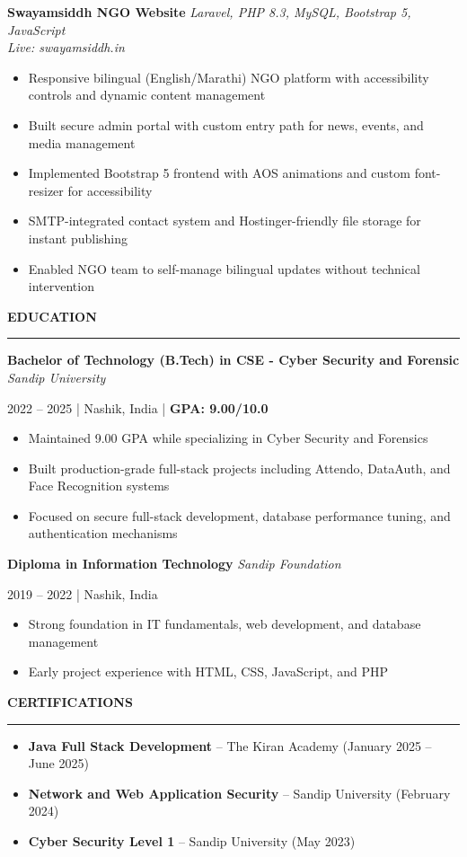 \documentclass[10pt,letterpaper]{article}
\newcommand{\resheading}[1]{
    {\large \textbf{#1}}
    \vspace{0.3em}
    \hrule
    \vspace{0.1em}
}
\newcommand{\ressection}[2]{
    \textbf{#1} \hfill \textit{#2} \\
}
\newcommand{\resitem}[1]{
    \item #1 \vspace{-0.2em}
}
\newcommand{\ressubsection}[4]{
    \ressection{#1}{#2}
    \textit{#3} \newline
    #4
}
\begin{document}
\vspace{0.3em}

\ressubsection{Swayamsiddh NGO Website}{Laravel, PHP 8.3, MySQL, Bootstrap 5, JavaScript}{
Live: swayamsiddh.in
}{
\begin{itemize}[itemsep=0.2em]
    \resitem{Responsive bilingual (English/Marathi) NGO platform with accessibility controls and dynamic content management}
    \resitem{Built secure admin portal with custom entry path for news, events, and media management}
    \resitem{Implemented Bootstrap 5 frontend with AOS animations and custom font-resizer for accessibility}
    \resitem{SMTP-integrated contact system and Hostinger-friendly file storage for instant publishing}
    \resitem{Enabled NGO team to self-manage bilingual updates without technical intervention}
\end{itemize}
}

\vspace{0.4em}

\resheading{EDUCATION}

\ressubsection{Bachelor of Technology (B.Tech) in CSE - Cyber Security and Forensic}{Sandip University}{}{
2022 -- 2025 | Nashik, India | \textbf{GPA: 9.00/10.0}
}
\vspace{-0.5em}
\begin{itemize}[itemsep=0.2em]
    \resitem{Maintained 9.00 GPA while specializing in Cyber Security and Forensics}
    \resitem{Built production-grade full-stack projects including Attendo, DataAuth, and Face Recognition systems}
    \resitem{Focused on secure full-stack development, database performance tuning, and authentication mechanisms}
\end{itemize}

\vspace{0.3em}

\ressubsection{Diploma in Information Technology}{Sandip Foundation}{}{
2019 -- 2022 | Nashik, India
}
\vspace{-0.5em}
\begin{itemize}[itemsep=0.2em]
    \resitem{Strong foundation in IT fundamentals, web development, and database management}
    \resitem{Early project experience with HTML, CSS, JavaScript, and PHP}
\end{itemize}

\vspace{0.4em}

\resheading{CERTIFICATIONS}

\begin{itemize}[itemsep=0.2em]
    \resitem{\textbf{Java Full Stack Development} -- The Kiran Academy (January 2025 -- June 2025)}
    \resitem{\textbf{Network and Web Application Security} -- Sandip University (February 2024)}
    \resitem{\textbf{Cyber Security Level 1} -- Sandip University (May 2023)}
\end{itemize}
\end{document}
